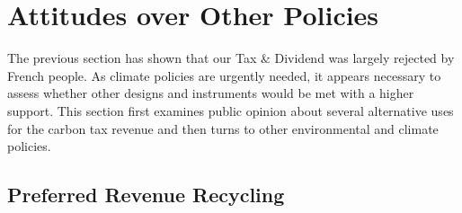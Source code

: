 \documentclass[english,5p,authoryear]{elsarticle}
\begin{document}



\section{Attitudes over Other Policies}\label{sec:attitudes_other_policies}

The previous section has shown that our Tax \& Dividend was largely rejected by French people. As climate policies are urgently needed, it appears necessary to assess whether other designs and instruments would be met with a higher support. This section first examines public opinion about several alternative uses for the carbon tax revenue and then turns to other environmental and climate policies.

    \subsection{Preferred Revenue Recycling}
\end{document}
